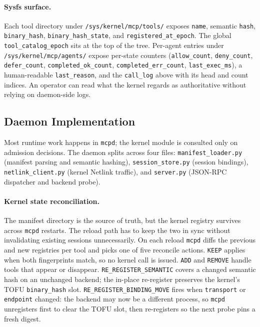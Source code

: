 \paragraph{Sysfs surface.}
Each tool directory under \texttt{/\allowbreak sys/\allowbreak kernel/\allowbreak mcp/\allowbreak tools/} exposes \texttt{name}, semantic \texttt{hash}, \texttt{binary\_\allowbreak hash}, \texttt{binary\_\allowbreak hash\_\allowbreak state}, and \texttt{registered\_\allowbreak at\_\allowbreak epoch}.
The global \texttt{tool\_\allowbreak catalog\_\allowbreak epoch} sits at the top of the tree.
Per-agent entries under \texttt{/\allowbreak sys/\allowbreak kernel/\allowbreak mcp/\allowbreak agents/} expose per-state counters (\texttt{allow\_\allowbreak count}, \texttt{deny\_\allowbreak count}, \texttt{defer\_\allowbreak count}, \texttt{completed\_\allowbreak ok\_\allowbreak count}, \texttt{completed\_\allowbreak err\_\allowbreak count}, \texttt{last\_\allowbreak exec\_\allowbreak ms}), a human-readable \texttt{last\_\allowbreak reason}, and the \texttt{call\_\allowbreak log} above with its head and count indices.
An operator can read what the kernel regards as authoritative without relying on daemon-side logs.



\subsection{Daemon Implementation}
\label{sec:daemon-implementation}

Most runtime work happens in \texttt{mcpd}; the kernel module is consulted only on admission decisions.
The daemon splits across four files: \texttt{manifest\_\allowbreak loader.py} (manifest parsing and semantic hashing), \texttt{session\_\allowbreak store.py} (session bindings), \texttt{netlink\_\allowbreak client.py} (kernel Netlink traffic), and \texttt{server.py} (JSON-RPC dispatcher and backend probe).

\paragraph{Kernel state reconciliation.}
The manifest directory is the source of truth, but the kernel registry survives across \texttt{mcpd} restarts.
The reload path has to keep the two in sync without invalidating existing sessions unnecessarily.
On each reload \texttt{mcpd} diffs the previous and new registries per tool and picks one of five reconcile actions.
\texttt{KEEP} applies when both fingerprints match, so no kernel call is issued.
\texttt{ADD} and \texttt{REMOVE} handle tools that appear or disappear.
\texttt{RE\_\allowbreak REGISTER\_\allowbreak SEMANTIC} covers a changed semantic hash on an unchanged backend; the in-place re-register preserves the kernel's TOFU \texttt{binary\_\allowbreak hash} slot.
\texttt{RE\_\allowbreak REGISTER\_\allowbreak BINDING\_\allowbreak MOVE} fires when \texttt{transport} or \texttt{endpoint} changed: the backend may now be a different process, so \texttt{mcpd} unregisters first to clear the TOFU slot, then re-registers so the next probe pins a fresh digest.

